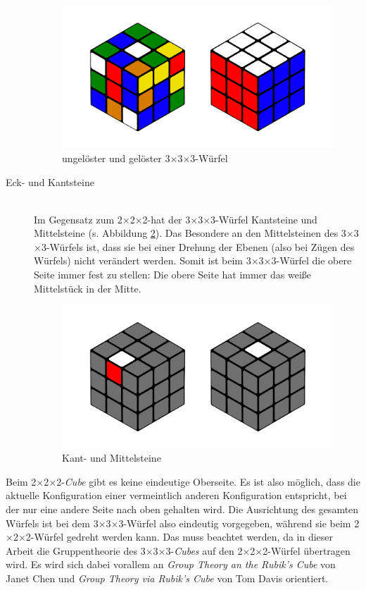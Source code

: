 \documentclass[12pt,a4paper, usenames, dvipsnames]{article}
\theoremstyle{mystyle}
\theoremstyle{definition}
\newcommand{\Ttwo}{2$\times$2$\times$2-}
\newcommand{\Tthree}{3$\times$3$\times$3-}
\begin{document}
\begin{description}
\begin{figure}[h]
\centering
\includegraphics[scale=0.11]{3x3_sc_so.png}
\caption[ungelöster und gelöster \Tthree Würfel]{ungelöster und gelöster \Tthree Würfel}
\label{5}
\end{figure}

\newpage
\item[Eck- und Kantsteine] \ \\
Im Gegensatz zum \Ttwo hat der \Tthree Würfel Kantsteine und Mittelsteine (s. Abbildung \ref{6}).
Das Besondere an den Mittelsteinen des \Tthree Würfels ist, dass sie bei einer Drehung der Ebenen (also bei Zügen des Würfels) nicht verändert werden. Somit ist beim \Tthree Würfel die obere Seite immer fest zu stellen: Die obere Seite hat immer das weiße Mittelstück in der Mitte. 
\begin{figure}[H]
\centering
\includegraphics[scale=0.11]{mittelkant.png}
\caption[Kant- und Mittelsteine]{Kant- und Mittelsteine}
\label{6}
\end{figure}



\end{description}

Beim \Ttwo \textit{Cube} gibt es keine eindeutige Oberseite. Es ist also möglich, dass die aktuelle Konfiguration einer vermeintlich anderen Konfiguration entspricht, bei der nur eine andere Seite nach oben gehalten wird.
Die Ausrichtung des gesamten Würfels ist bei dem \Tthree Würfel also eindeutig vorgegeben, während sie beim \Ttwo Würfel gedreht werden kann.  
Das muss beachtet werden, da in dieser Arbeit die Gruppentheorie des \Tthree \textit{Cubes} auf den \Ttwo Würfel übertragen wird. Es wird sich dabei vorallem an \textit{Group Theory an the Rubik's Cube} von Janet Chen \cite{JC} und \textit{Group Theory via Rubik's Cube} von Tom Davis \cite{TD} orientiert.
\end{document}

